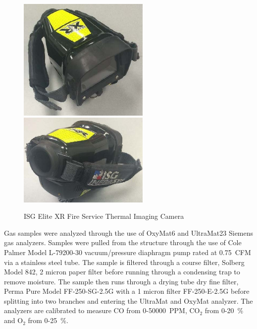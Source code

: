 \documentclass[12pt,oneside]{book}
\begin{document}
\begin{figure}[H]
	\centering
	\includegraphics[width = 2.5in]{0_Images/Instrumentation/ISG_IR.jpg}
	\includegraphics[width = 2.5in]{0_Images/Instrumentation/ISG_IR2.jpg}
	\caption{ISG Elite XR Fire Service Thermal Imaging Camera}
	\label{fig:IRCam}
\end{figure}

Gas samples were analyzed through the use of OxyMat6 and UltraMat23 Siemens gas analyzers. Samples were pulled from the structure through the use of Cole Palmer Model L-79200-30 vacuum/pressure diaphragm pump rated at 0.75~CFM via a stainless steel tube. The sample is filtered through a course filter, Solberg Model 842, 2 micron paper filter before running through a condensing trap to remove moisture. The sample then runs through a drying tube dry fine filter, Perma Pure Model FF-250-SG-2.5G with a 1 micron filter FF-250-E-2.5G before splitting into two branches and entering the UltraMat and OxyMat analyzer. The analyzers are calibrated to measure CO from 0-50000~PPM, CO$_2$ from 0-20~\% and O$_2$ from 0-25~\%. 
\end{document}
